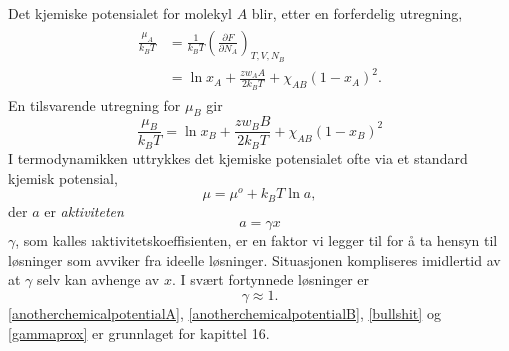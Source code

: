 Det kjemiske potensialet for molekyl $A$ blir, etter en forferdelig utregning,
\begin{align}
\label{anotherchemicalpotentialA}
\begin{split}
	\frac{\mu_A}{k_BT} &= \frac{1}{k_BT}\left(\frac{\partial F}{\partial N_A}\right)_{T,V,N_B} \\ &= \ln x_A+\frac{zw_AA}{2k_BT}+\chi_{AB}(1-x_A)^2.
\end{split}
\end{align}
En tilsvarende utregning for $\mu_B$ gir
\begin{equation}
\label{anotherchemicalpotentialB}
	\frac{\mu_B}{k_BT} = \ln x_B+\frac{zw_BB}{2k_BT}+\chi_{AB}(1-x_B)^2
\end{equation}
I termodynamikken uttrykkes det kjemiske potensialet ofte via et standard kjemisk potensial,
\begin{equation}
	\label{bullshit}
	\mu=\mu^o+k_BT\ln a,
\end{equation}
der $a$ er \emph{aktiviteten}
\begin{equation}
	a=\gamma x
\end{equation}
$\gamma$, som kalles \i{aktivitetskoeffisient}en, er en faktor vi legger til for å ta hensyn til løsninger som avviker fra ideelle løsninger. Situasjonen kompliseres imidlertid av at $\gamma$ selv kan avhenge av $x$. I svært fortynnede løsninger er 
\begin{equation}
	\label{gammaprox}
	\gamma \approx 1.
\end{equation}
\eqref{anotherchemicalpotentialA}, \eqref{anotherchemicalpotentialB}, \eqref{bullshit} og \eqref{gammaprox} er grunnlaget for kapittel 16. 

